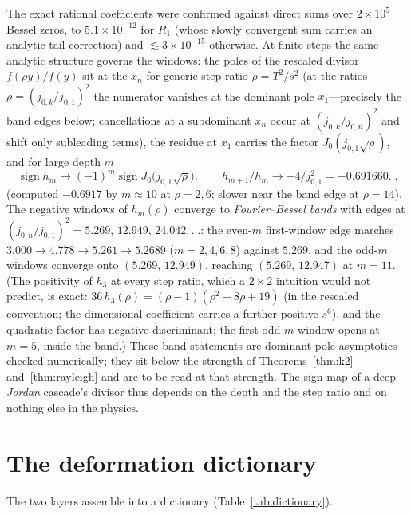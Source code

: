 ﻿\documentclass[11pt]{article}
\theoremstyle{remark}
\begin{document}
The exact rational coefficients were confirmed against direct sums
over $2\times10^5$ Bessel zeros, to $5.1\times10^{-12}$ for
$R_1$ (whose slowly convergent sum carries an analytic tail
correction) and $\lesssim3\times10^{-15}$ otherwise. At
finite steps the same analytic structure governs the windows: the
poles of the rescaled divisor $f(\rho y)/f(y)$ sit at the $x_n$
for generic step ratio $\rho=T^2/s^2$ (at the ratios
$\rho=(j_{0,k}/j_{0,1})^2$ the numerator vanishes at the dominant
pole $x_1$---precisely the band edges below; cancellations at a
subdominant $x_n$ occur at $(j_{0,k}/j_{0,n})^2$ and shift only
subleading terms),
the residue at $x_1$ carries the factor
$J_0(j_{0,1}\sqrt\rho)$, and for large depth $m$
\[
\operatorname{sign} h_m\to(-1)^m\operatorname{sign}
J_0\bigl(j_{0,1}\sqrt\rho\bigr),
\qquad
h_{m+1}/h_m\to-4/j_{0,1}^2=-0.691660\ldots
\]
(computed $-0.6917$ by $m\approx10$ at $\rho=2,6$; slower near the
band edge at $\rho=14$). The negative windows of
$h_m(\rho)$ converge to \emph{Fourier--Bessel bands} with edges at
$(j_{0,n}/j_{0,1})^2=5.269,\,12.949,\,24.042,\ldots$: the even-$m$
first-window edge marches $3.000\to4.778\to5.261\to5.2689$
($m=2,4,6,8$) against $5.269$, and the odd-$m$ windows converge
onto $(5.269,\,12.949)$, reaching $(5.269,\,12.947)$ at $m=11$.
(The positivity of $h_3$ at every step ratio, which a $2{\times}2$ intuition
would not predict, is exact:
$36\,h_3(\rho)=(\rho-1)(\rho^2-8\rho+19)$ (in the rescaled convention;
the dimensional coefficient carries a further positive $s^6$), and the quadratic factor has
negative discriminant; the first odd-$m$ window opens at $m=5$,
inside the band.) These band statements are dominant-pole
asymptotics checked numerically; they sit below the strength of
Theorems~\ref{thm:k2} and~\ref{thm:rayleigh} and are to be read at
that strength. The sign map of a deep \emph{Jordan} cascade's
divisor thus depends on the depth and the step ratio and on
nothing else in the physics.

\section{The deformation dictionary}
\label{sec:dictionary}

The two layers assemble into a dictionary
(Table~\ref{tab:dictionary}).
\end{document}
